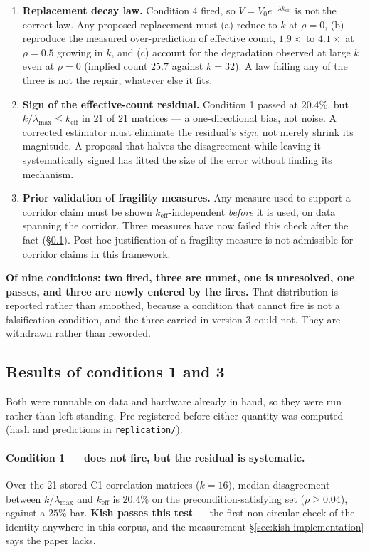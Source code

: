 \documentclass[11pt,a4paper]{article}
\theoremstyle{definition}
\theoremstyle{remark}
\newcommand{\keff}{k_{\text{eff}}}
\begin{document}
\begin{enumerate}[resume]
    \item \textbf{Replacement decay law.} Condition 4 fired, so $V = V_0 e^{-\lambda\keff}$ is not the correct law. Any proposed replacement must (a) reduce to $k$ at $\rho = 0$, (b) reproduce the measured over-prediction of effective count, $1.9\times$ to $4.1\times$ at $\rho = 0.5$ growing in $k$, and (c) account for the degradation observed at large $k$ even at $\rho = 0$ (implied count $25.7$ against $k = 32$). A law failing any of the three is not the repair, whatever else it fits.
    \item \textbf{Sign of the effective-count residual.} Condition 1 passed at $20.4\%$, but $k/\lambda_{\max} \leq \keff$ in $21$ of $21$ matrices --- a one-directional bias, not noise. A corrected estimator must eliminate the residual's \emph{sign}, not merely shrink its magnitude. A proposal that halves the disagreement while leaving it systematically signed has fitted the size of the error without finding its mechanism.
    \item \textbf{Prior validation of fragility measures.} Any measure used to support a corridor claim must be shown $\keff$-independent \emph{before} it is used, on data spanning the corridor. Three measures have now failed this check after the fact (\S\ref{sec:f1f3-results}). Post-hoc justification of a fragility measure is not admissible for corridor claims in this framework.
\end{enumerate}

\textbf{Of nine conditions: two fired, three are unmet, one is unresolved, one passes, and three
are newly entered by the fires.}
That distribution is reported rather than smoothed, because a condition that cannot fire is not
a falsification condition, and the three carried in version 3 could not. They are withdrawn
rather than reworded.

\subsection{Results of conditions 1 and 3}
\label{sec:f1f3-results}

Both were runnable on data and hardware already in hand, so they were run rather than left
standing. Pre-registered before either quantity was computed (hash and predictions in
\texttt{replication/}).

\paragraph{Condition 1 --- does not fire, but the residual is systematic.}
Over the 21 stored C1 correlation matrices ($k=16$), median disagreement between
$k/\lambda_{\max}$ and $\keff$ is $\mathbf{20.4\%}$ on the precondition-satisfying set
($\rho \geq 0.04$), against a $25\%$ bar. \textbf{Kish passes this test} --- the first
non-circular check of the identity anywhere in this corpus, and the measurement
\S\ref{sec:kish-implementation} says the paper lacks.
\end{document}
